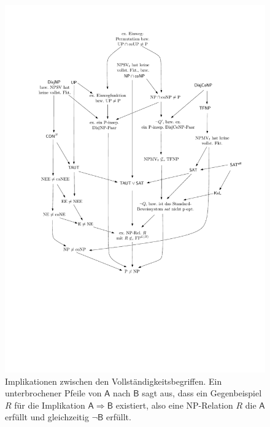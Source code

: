 \begin{figure}
    \centering\includegraphics[page=2]{figures.pdf}
    \caption{Implikationen zwischen den  Vollständigkeitsbegriffen. Ein unterbrochener Pfeile von $\mathsf{A}$ nach $\mathsf{B}$ sagt aus, dass ein Gegenbeispiel $R$ für die Implikation $\mathsf{A\Rightarrow B}$ existiert, also eine NP-Relation $R$ die $\mathsf{A}$ erfüllt und gleichzeitig $\neg\mathsf{B}$ erfüllt.}\label{fig:reduktionsbegriffe}
\end{figure}



